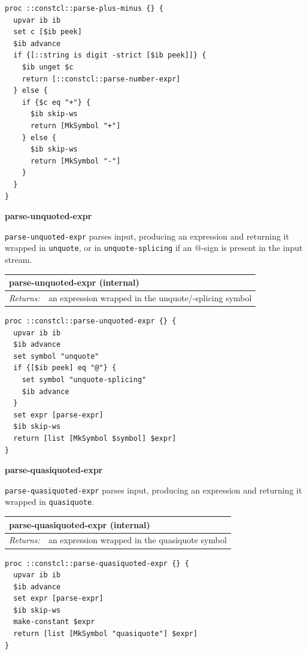 \documentclass[twoside,9pt]{report}
\begin{document}
\noindent\makebox[\linewidth]{\rule{\linewidth}{0.4pt}}
\begin{lstlisting}
proc ::constcl::parse-plus-minus {} {
  upvar ib ib
  set c [$ib peek]
  $ib advance
  if {[::string is digit -strict [$ib peek]]} {
    $ib unget $c
    return [::constcl::parse-number-expr]
  } else {
    if {$c eq "+"} {
      $ib skip-ws
      return [MkSymbol "+"]
    } else {
      $ib skip-ws
      return [MkSymbol "-"]
    }
  }
}
\end{lstlisting}
\noindent\makebox[\linewidth]{\rule{\linewidth}{0.4pt}}

\textbf{parse-unquoted-expr}


\texttt{parse-unquoted-expr} parses input, producing an expression and returning it wrapped in \texttt{unquote}, or in \texttt{unquote-splicing} if an @-sign is present in the input stream.

\begin{tabular}{ |l l| }
\hline
\multicolumn{2}{|l|}{parse-unquoted-expr (internal)} \\
\hline
\textit{Returns:} & an expression wrapped in the unquote/-splicing symbol \\
\hline
\end{tabular}

\noindent\makebox[\linewidth]{\rule{\linewidth}{0.4pt}}
\begin{lstlisting}
proc ::constcl::parse-unquoted-expr {} {
  upvar ib ib
  $ib advance
  set symbol "unquote"
  if {[$ib peek] eq "@"} {
    set symbol "unquote-splicing"
    $ib advance
  }
  set expr [parse-expr]
  $ib skip-ws
  return [list [MkSymbol $symbol] $expr]
}
\end{lstlisting}
\noindent\makebox[\linewidth]{\rule{\linewidth}{0.4pt}}

\textbf{parse-quasiquoted-expr}


\texttt{parse-quasiquoted-expr} parses input, producing an expression and returning it wrapped in \texttt{quasiquote}.

\begin{tabular}{ |l l| }
\hline
\multicolumn{2}{|l|}{parse-quasiquoted-expr (internal)} \\
\hline
\textit{Returns:} & an expression wrapped in the quasiquote symbol \\
\hline
\end{tabular}

\noindent\makebox[\linewidth]{\rule{\linewidth}{0.4pt}}
\begin{lstlisting}
proc ::constcl::parse-quasiquoted-expr {} {
  upvar ib ib
  $ib advance
  set expr [parse-expr]
  $ib skip-ws
  make-constant $expr
  return [list [MkSymbol "quasiquote"] $expr]
}
\end{lstlisting}
\noindent\makebox[\linewidth]{\rule{\linewidth}{0.4pt}}
\end{document}
